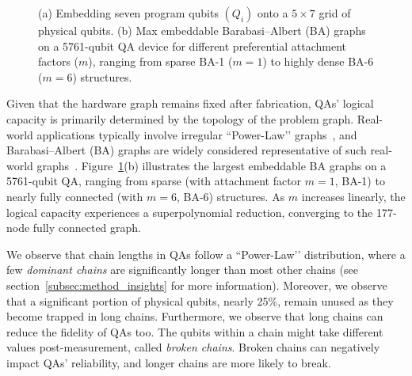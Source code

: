 \begin{figure}[htb]
    \captionsetup[subfigure]{position=top} %
    \centering
    \caption{
(a) Embedding seven program qubits $(Q_i)$ onto a $5\times7$ grid of physical qubits.
(b) Max embeddable Barabasi--Albert (BA) graphs on a 5761-qubit QA device for different preferential attachment factors (${m}$), ranging from sparse BA-1 ($m=1$) to highly dense BA-6 ($m=6$) structures.
            }    
    \label{fig:intro_embedding}    
\end{figure}  




Given that the hardware graph remains fixed after fabrication, QAs’ logical capacity is primarily determined by the topology of the problem graph.
Real-world applications typically involve irregular ``Power-Law’’ graphs~\cite{agler2016microbial,clauset2016colorado,gamermann2019comprehensive,goh2002classification,house2015testing,mislove2007measurement,pastor2015epidemic}, 
and Barabasi--Albert (BA) graphs are widely considered representative of such real-world graphs~\cite{albert2005scale,barabasi1999emergence,barabasi2000scale,gray2018super,kim2022sparsity,lusseau2003emergent,wang2019complex,zadorozhnyi2012structural,zbinden2020embedding}.
Figure~\ref{fig:intro_embedding}(b) illustrates the largest embeddable BA graphs on a 5761-qubit QA, ranging from sparse (with attachment factor $m=1$, BA-1) to nearly fully connected (with $m=6$, BA-6) structures.
As $m$ increases linearly, the logical capacity experiences a superpolynomial reduction, converging to the 177-node fully connected graph.

We observe that chain lengths in QAs follow a ``Power-Law’’ distribution, where a few \emph{dominant chains} are significantly longer than most other chains (see section~\ref{subsec:method_insights} for more information). 
Moreover, we observe that a significant portion of physical qubits, nearly 25\%, remain unused as they become trapped in long chains. 
Furthermore, we observe that long chains can reduce the fidelity of QAs too. 
The qubits within a chain might take different values post-measurement, called \emph{broken chains}. 
Broken chains can negatively impact QAs' reliability, and longer chains are more likely to break. 


